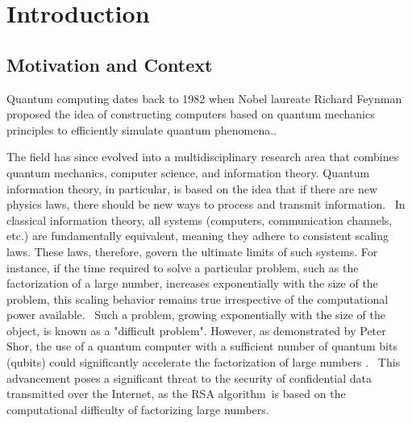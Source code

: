 \chapter{Introduction}


\section{Motivation and Context}


Quantum computing dates back to 1982 when Nobel laureate Richard Feynman proposed the idea of constructing computers based on quantum mechanics principles to efficiently simulate quantum phenomena.\cite{feynman2018simulating}. 

The field has since evolved into a multidisciplinary research area that combines quantum mechanics, computer science, and information theory. Quantum information theory, in particular, is based on the idea that if there are new physics laws, there should be new ways to process and transmit information.  In classical information theory, all systems (computers, communication channels, etc.) are fundamentally equivalent, meaning they adhere to consistent scaling laws. These laws, therefore, govern the ultimate limits of such systems. For instance, if the time required to solve a particular problem, such as the factorization of a large number, increases exponentially with the size of the problem, this scaling behavior remains true irrespective of the computational power available.  Such a problem, growing exponentially with the size of the object, is known as a "difficult problem". However, as demonstrated by Peter Shor, the use of a quantum computer with a sufficient number of quantum bits (qubits) could significantly accelerate the factorization of large numbers \cite{shor1994algorithms}.  This advancement poses a significant threat to the security of confidential data transmitted over the Internet, as the RSA algorithm is based on the computational difficulty of factorizing large numbers.

